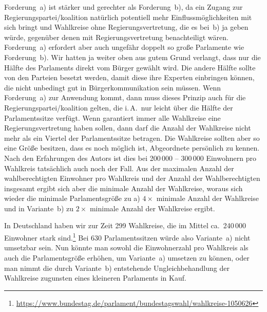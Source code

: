 Forderung~a) ist stärker und gerechter als Forderung~b), da ein Zugang zur
Regierungspartei/koalition natürlich potentiell mehr Einflussmöglichkeiten mit sich bringt und
Wahlkreise ohne Regierungsvertretung, die es bei~b) ja geben würde, gegenüber denen mit
Regierungsvertretung benachteiligt wären. Forderung~a) erfordert aber auch ungefähr doppelt so
große Parlamente wie Forderung~b).
Wir hatten ja weiter oben aus gutem Grund verlangt, dass nur die Hälfte des Parlaments direkt
vom Bürger gewählt wird. Die andere Hälfte sollte von den Parteien besetzt werden, damit diese
ihre Experten einbringen können, die nicht unbedingt gut in Bürgerkommunikation sein müssen. Wenn
Forderung~a) zur Anwendung kommt, dann muss dieses Prinzip auch für die Regierungspartei/koalition
gelten, die i.\,A.\ nur leicht über die Hälfte der Parlamentssitze verfügt. Wenn garantiert immer
alle Wahlkreise eine Regierungsvertretung haben sollen, dann darf die Anzahl der Wahlkreise nicht
mehr als ein Viertel der Parlamentssitze betragen. Die Wahlkreise sollten aber so eine Größe
besitzen, dass es noch möglich ist, Abgeordnete persönlich zu kennen. Nach den Erfahrungen des
Autors ist dies bei 200\,000 -- 300\,000 Einwohnern pro Wahlkreis tatsächlich auch noch der Fall.
Aus der maximalen Anzahl der wahlberechtigten Einwohner pro Wahlkreis und der Anzahl der
Wahlberechtigten insgesamt ergibt sich aber die minimale Anzahl der Wahlkreise, woraus sich
wieder die minimale Parlamentsgröße zu a) $4\times$ minimale Anzahl der Wahlkreise und in
Variante~b) zu $2\times$ minimale Anzahl der Wahlkreise ergibt.

In Deutschland haben wir zur Zeit 299 Wahlkreise, die im Mittel ca.\ 240\,000 Einwohner stark
sind.\footnote{\url{https://www.bundestag.de/parlament/bundestagswahl/wahlkreise-1050626}} Bei
630 Parlamentssitzen würde also Variante~a) nicht umsetzbar sein. Nun könnte man sowohl die
Einwohnerzahl pro Wahlkreis als auch die Parlamentsgröße erhöhen, um Variante~a) umsetzen zu
können, oder man nimmt die durch Variante~b) entstehende Ungleichbehandlung der Wahlkreise
zugunsten eines kleineren Parlaments in Kauf.

